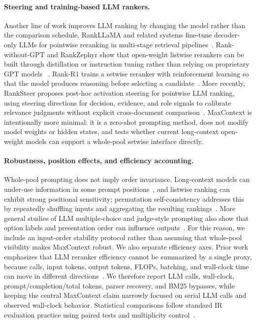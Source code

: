 \paragraph{Steering and training-based LLM rankers.}
Another line of work improves LLM ranking by changing the model rather
than the comparison schedule. RankLLaMA and related systems fine-tune
decoder-only LLMs for pointwise reranking in multi-stage retrieval
pipelines~\citep{ma2024rankllama}. Rank-without-GPT and RankZephyr show
that open-weight listwise rerankers can be built through distillation or
instruction tuning rather than relying on proprietary GPT models
~\citep{zhang2025rankwithoutgpt,pradeep2023rankzephyr}. Rank-R1 trains a
setwise reranker with reinforcement learning so that the model produces
reasoning before selecting a candidate~\citep{zhuang2025rankr1}. More
recently, RankSteer proposes post-hoc activation steering for pointwise
LLM ranking, using steering directions for decision, evidence, and role
signals to calibrate relevance judgments without explicit cross-document
comparison~\citep{wang2026ranksteer}. MaxContext is intentionally more
minimal: it is a zero-shot prompting method, does not modify model
weights or hidden states, and tests whether current long-context
open-weight models can support a whole-pool setwise interface directly.

\paragraph{Robustness, position effects, and efficiency accounting.}
Whole-pool prompting does not imply order invariance. Long-context models
can under-use information in some prompt positions~\citep{liu2024lostmiddle},
and listwise ranking can exhibit strong positional sensitivity; permutation
self-consistency addresses this by repeatedly shuffling inputs and
aggregating the resulting rankings~\citep{tang2024foundmiddle}. More
general studies of LLM multiple-choice and judge-style prompting also
show that option labels and presentation order can influence
outputs~\citep{zheng2024mcqbias,shi2025positionbias}. For this reason,
we include an input-order stability protocol rather than assuming that
whole-pool visibility makes MaxContext robust. We also separate
efficiency axes. Prior work emphasizes that LLM reranker efficiency
cannot be summarized by a single proxy, because calls, input tokens,
output tokens, FLOPs, batching, and wall-clock time can move in different
directions~\citep{zhuang2024setwise,podolak2025setwiseinsertion,
peng2025flopsreranking}. We therefore report LLM calls, wall-clock,
prompt/completion/total tokens, parser recovery, and BM25 bypasses, while
keeping the central MaxContext claim narrowly focused on serial LLM calls
and observed wall-clock behavior. Statistical comparisons follow
standard IR evaluation practice using paired tests and multiplicity
control~\citep{smucker2007comparison,urbano2019significance}.